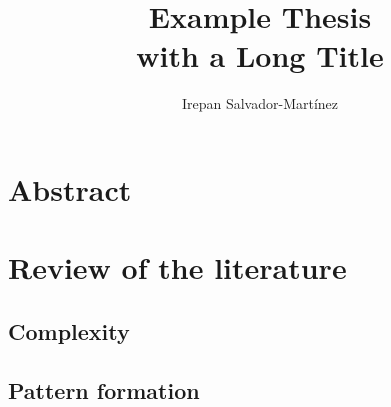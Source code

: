\documentclass[officiallayout]{tktla_modified}
\title{Example Thesis \\ with a Long Title}
\author{Irepan Salvador-Mart\'inez}
\begin{document}
\frontmatter

\maketitle


\begin{acknowledgements}
  
\end{acknowledgements}


\tableofcontents

\mainmatter







\chapter{Abstract}
	


\chapter{Review of the literature}

	\section{Complexity}
	

	\section{Pattern formation}
	
\end{document}
